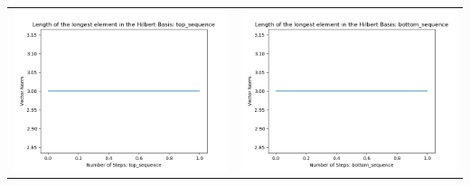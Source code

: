 \documentclass[10pt]{article}
\begin{document}
\begin{tabular}{c|c}
\begin{minipage}{.45\textwidth}
\includegraphics[width=\textwidth]{"DATA/5d/6 generators 1 bound H/top_sequence LENGTH"}
\end{minipage} &
\begin{minipage}{.45\textwidth}
\includegraphics[width=\textwidth]{"DATA/5d/6 generators 1 bound H bottomup/bottom_sequence LENGTH"}
\end{minipage}
\end{tabular}
\end{document}
